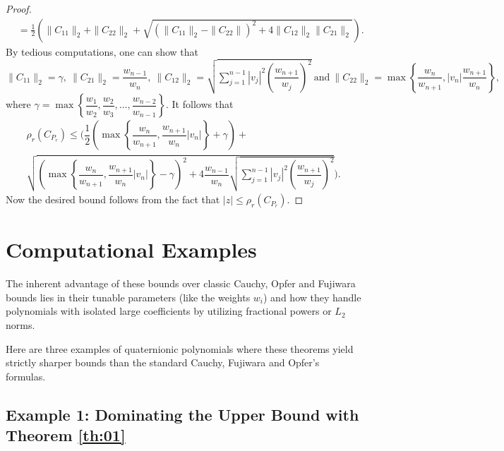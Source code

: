 \documentclass [12pt]{article}
\begin{document}
\begin{proof}
\begin{align*}
		&= \frac{1}{2} \left( \|C_{11}\|_{2} + \|C_{22}\|_{2} + \sqrt{(\|C_{11}\|_{2} - \|C_{22}\|)^2 + 4 \|C_{12}\|_{2} \|C_{21}\|_{2}} \right).
	\end{align*}
	By tedious computations, one can show that $\|C_{11}\|_{2}=\gamma, ~\|C_{21}\|_{2}=\dfrac{w_{n-1}}{w_{n}}, ~\|C_{12}\|_{2}=\sqrt{\sum_{j=1}^{n-1}|v_{j}|^{2}\left(\dfrac{w_{n+1}}{w_{j}}\right)^{2}} ~\mbox{and}~\|C_{22}\|_{2}=\max\left\{\dfrac{w_{n}}{w_{n+1}},|v_{n}|\dfrac{w_{n+1}}{w_{n}}\right\},$ \\where $\gamma=\max\left\{\dfrac{w_{1}}{w_{2}} ,  \dfrac{w_{2}}{w_{3}},\dots,\dfrac{w_{n-2}}{w_{n-1}}           \right\}.$
	It follows that\\
	\begin{multline*}
		\rho_{r}(C_{P_{r}})\le \biggl(\dfrac{1}{2}                                  \left( \max \left\{ \dfrac{w_{n}}{w_{n+1}},\dfrac{w_{n+1}}{w_{n}}|v_{n}|\right\}+\gamma\right)+\\\sqrt{   \left( \max \left\{ \dfrac{w_{n}}{w_{n+1}},\dfrac{w_{n+1}}{w_{n}}|v_{n}|\right\}-\gamma\right)^{2}    +4\dfrac{w_{n-1}}{w_{n}} \sqrt{\sum_{j=1}^{n-1}|v_{j}|^{2}\left(\dfrac{w_{n+1}}{w_{j}}\right)^{2}}} \biggr).
	\end{multline*}
	Now the desired bound follows from the fact that $|z|\le \rho_{r}(C_{P_{r}}).$
\end{proof}
\section{Computational Examples}
The inherent advantage of these bounds over classic Cauchy, Opfer and Fujiwara bounds lies in their tunable parameters (like the weights $w_i$) and how they handle polynomials with isolated large coefficients by utilizing fractional powers or $L_2$ norms. 

Here are three examples of quaternionic polynomials where these theorems yield strictly sharper bounds than the standard Cauchy, Fujiwara and Opfer's formulas.

\subsection*{Example 1: Dominating the Upper Bound with Theorem \ref{th:01}}
\end{document}
